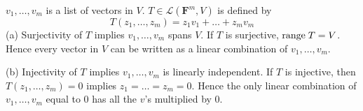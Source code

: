 \documentclass[a5paper]{article}
\begin{document}
\newcommand    \C  { \mathbf{C} }
\newcommand    \R  { \mathbf{R} }
\renewcommand  \L  { \mathcal{L} }
\newcommand    \F  { \mathbf{F} }

$v_1,\dots,v_m$ is a list of vectors in $V$.
$T \in \L(\F^m, V)$ is defined by
\begin{equation*}
    T(z_1,\dots,z_m) = z_1v_1 + \dots + z_mv_m
\end{equation*}
(a) Surjectivity of $T$ implies $v_1,\dots,v_m$ spans $V$.
If $T$ is surjective, $\text{range\;}T = V$.
Hence every vector in $V$ can be written as a linear combination of $v_1,\dots,v_m$.

(b) Injectivity of $T$ implies $v_1,\dots,v_m$ is linearly independent.
If $T$ is injective, then $T(z_1,\dots,z_m)=0$ implies $z_1 = \dots = z_m = 0$.
Hence the only linear combination of $v_1,\dots,v_m$ equal to 0 has all the $v$'s multiplied by 0.
\end{document}
